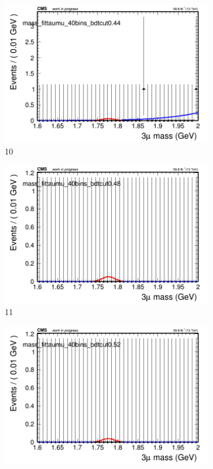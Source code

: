 \begin{figure}[h!]
\begin{subfigure}{0.2\textwidth}
        \includegraphics[width=\textwidth]{power_law/plots/taumu/massfit_taumu_40bins_bdtcut0.44.png}
        \caption{10}
    \end{subfigure}
    \begin{subfigure}{0.2\textwidth}
        \includegraphics[width=\textwidth]{power_law/plots/taumu/massfit_taumu_40bins_bdtcut0.48.png}
        \caption{11}
    \end{subfigure}
    \begin{subfigure}{0.2\textwidth}
        \includegraphics[width=\textwidth]{power_law/plots/taumu/massfit_taumu_40bins_bdtcut0.52.png}

\end{subfigure}
\end{figure}
